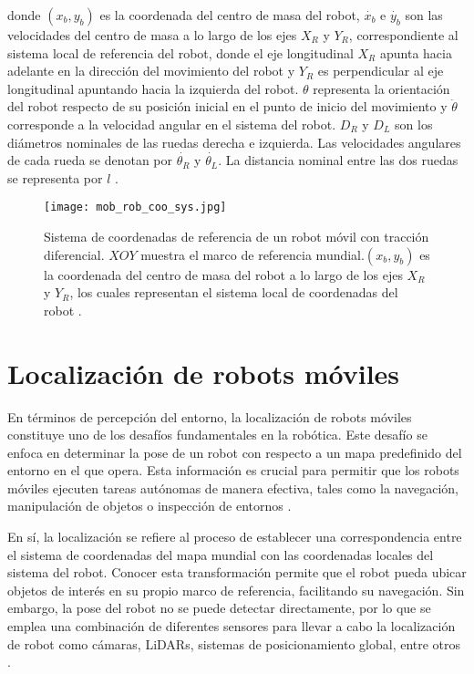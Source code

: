 donde $(x_{b},y_{b})$ es la coordenada del centro de masa del robot, $\dot{x_b}$ e $\dot{y_b}$ son las velocidades del centro de masa a lo largo de los ejes $X_R$ y $Y_R$, correspondiente al sistema local de referencia del robot, donde el eje longitudinal $X_R$ apunta hacia adelante en la dirección del movimiento del robot y $Y_R$ es perpendicular al eje longitudinal apuntando hacia la izquierda del robot. $\theta$ representa la orientación del robot respecto de su posición inicial en el punto de inicio del movimiento y $\dot{\theta}$ corresponde a la velocidad angular en el sistema del robot. $D_R$ y $D_L$ son los diámetros nominales de las ruedas derecha e izquierda. Las velocidades angulares de cada rueda se denotan por $\dot{\theta_{R}}$ y $\dot{\theta_{L}}$. La distancia nominal entre las dos ruedas se representa por $l$ \cite{multi-robot_nodate}.

\begin{figure}[H]
	\centering
	\texttt{[image: mob\_rob\_coo\_sys.jpg]}
	\caption{Sistema de coordenadas de referencia de un robot móvil con tracción diferencial. $XOY$ muestra el marco de referencia mundial.$(x_{b},y_{b})$ es la coordenada del centro de masa del robot a lo largo de los ejes $X_R$ y $Y_R$, los cuales representan el sistema local de coordenadas del robot \cite{multi-robot_nodate}.}
	\label{fig:coordenadas_rob_mob}
\end{figure}

\section{Localización de robots móviles}
En términos de percepción del entorno, la localización de robots móviles constituye uno de los desafíos fundamentales en la robótica. Este desafío se enfoca en determinar la pose de un robot con respecto a un mapa predefinido del entorno en el que opera. Esta información es crucial para permitir que los robots móviles ejecuten tareas autónomas de manera efectiva, tales como la navegación, manipulación de objetos o inspección de entornos \cite{niko_correll_kinematics}.

En sí, la localización se refiere al proceso de establecer una correspondencia entre el sistema de coordenadas del mapa mundial con las coordenadas locales del sistema del robot. Conocer esta transformación permite que el robot pueda ubicar objetos de interés en su propio marco de referencia, facilitando su navegación. Sin embargo, la pose del robot no se puede detectar directamente, por lo que se emplea una combinación de diferentes sensores para llevar a cabo la localización de robot como cámaras, LiDARs, sistemas de posicionamiento global, entre otros \cite{niko_correll_kinematics}. 

